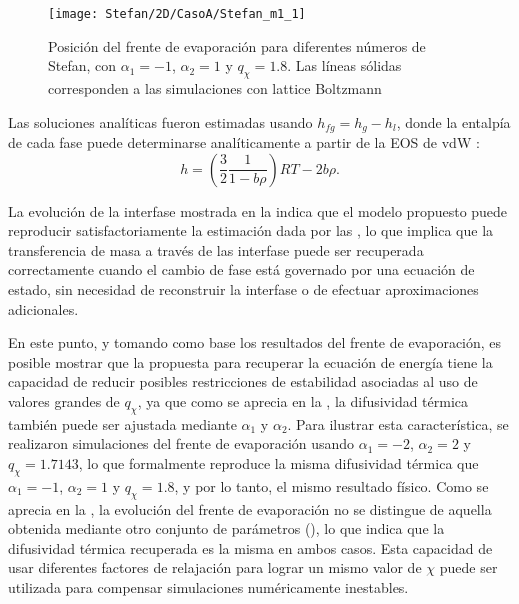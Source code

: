 \begin{figure}[ht]
	\centering
	\texttt{[image: Stefan/2D/CasoA/Stefan\_m1\_1]}
	\caption{Posici\'on del frente de evaporaci\'on para diferentes n\'umeros de Stefan, con $\alpha_1 = -1$, $\alpha_2=1$ y $q_{\chi} = 1.8$. Las l\'ineas s\'olidas corresponden a las simulaciones con lattice Boltzmann}
	\label{fig:Stefan_m1_1}
\end{figure}

Las soluciones anal\'iticas fueron estimadas usando $h_{fg}=h_g-h_l$, donde la entalp\'ia de cada fase puede determinarse anal\'iticamente a partir de la EOS de vdW \cite{markus_simulation_2011}:
\begin{equation}
	h = \left( \dfrac{3}{2} \dfrac{1}{1-b\rho} \right)RT - 2b\rho.
	\label{eq:hfg_vdw}
\end{equation}

La evoluci\'on de la interfase mostrada en la  indica que el modelo propuesto puede reproducir satisfactoriamente la estimaci\'on dada por las , lo que implica que la transferencia de masa a trav\'es de las interfase puede ser recuperada correctamente cuando el cambio de fase est\'a governado por una ecuaci\'on de estado, sin necesidad de reconstruir la interfase o de efectuar aproximaciones adicionales.

En este punto, y tomando como base los resultados del frente de evaporaci\'on, es posible mostrar que la \lbe{} propuesta para recuperar la ecuaci\'on de energ\'ia tiene la capacidad de reducir posibles restricciones de estabilidad asociadas al uso de valores grandes de $q_{\chi}$, ya que como se aprecia en la , la difusividad t\'ermica tambi\'en puede ser ajustada mediante $\alpha_1$ y $\alpha_2$. Para ilustrar esta caracter\'istica, se realizaron simulaciones del frente de evaporaci\'on usando $\alpha_1=-2$, $\alpha_2=2$ y $q_{\chi}=1.7143$, lo que formalmente reproduce la misma difusividad t\'ermica que $\alpha_1=-1$, $\alpha_2=1$ y $q_{\chi}=1.8$, y por lo tanto, el mismo resultado f\'isico. Como se aprecia en la , la evoluci\'on del frente de evaporaci\'on no se distingue de aquella obtenida mediante otro conjunto de par\'ametros (), lo que indica que la difusividad t\'ermica recuperada es la misma en ambos casos. Esta capacidad de usar diferentes factores de relajaci\'on para lograr un mismo valor de $\chi$ puede ser utilizada para compensar simulaciones num\'ericamente inestables.

